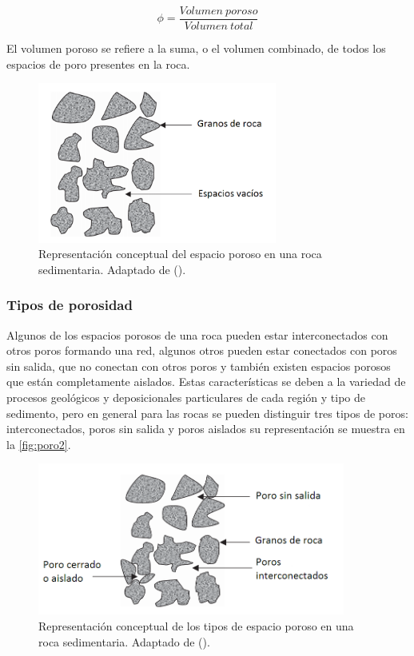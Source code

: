 \begin{equation}
        \phi = \frac{Volumen~ poroso}{Volumen~ total}
\end{equation}

El volumen poroso se refiere a la suma, o el volumen combinado, de todos los espacios de poro presentes en la roca.

\begin{figure}
\centering
\includegraphics[width=0.7\textwidth]{Graphics/poro1.png}
\caption[Concepto de porosidad]{Representación conceptual del espacio poroso en una roca sedimentaria. Adaptado de (\cite{Dandekar}). }
\label{fig:poro1}
\end{figure}

\subsubsection{Tipos de porosidad}
Algunos de los espacios porosos de una roca pueden estar interconectados con otros poros formando una red, algunos otros pueden estar conectados con poros sin salida, que no conectan con otros poros y también existen espacios porosos que están completamente aislados. Estas características se deben a la variedad de procesos geológicos y deposicionales particulares de cada región y tipo de sedimento, pero en general para las rocas se pueden distinguir tres tipos de poros: interconectados, poros sin salida y poros aislados su representación se muestra en la \autoref{fig:poro2}.

\begin{figure}
    \centering
    \includegraphics[width=0.9\textwidth]{Graphics/poro2.png}
    \caption[Tipos de porosidad]{Representación conceptual de los tipos de espacio poroso en una roca sedimentaria. Adaptado de (\cite{Dandekar}). }
    \label{fig:poro2}
\end{figure}


